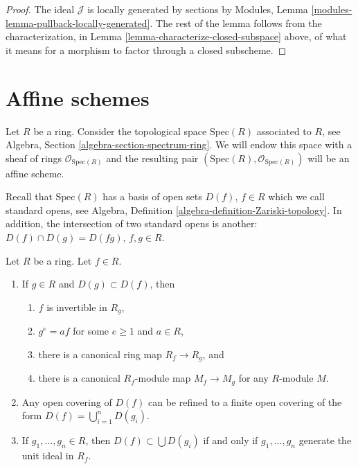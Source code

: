 \begin{proof}
The ideal $\mathcal{J}$ is locally generated by sections
by Modules, Lemma \ref{modules-lemma-pullback-locally-generated}.
The rest of the lemma follows from the characterization,
in Lemma \ref{lemma-characterize-closed-subspace} above,
of what it means for a morphism to factor through a closed
subscheme.
\end{proof}














\section{Affine schemes}
\label{section-affine-schemes}

\noindent
Let $R$ be a ring. Consider the topological space $\text{Spec}(R)$
associated to $R$, see Algebra, Section \ref{algebra-section-spectrum-ring}.
We will endow this space with a sheaf of rings $\mathcal{O}_{\text{Spec}(R)}$
and the resulting pair $(\text{Spec}(R), \mathcal{O}_{\text{Spec}(R)})$
will be an affine scheme.

\medskip\noindent
Recall that $\text{Spec}(R)$ has a basis of open sets $D(f)$,
$f \in R$ which we call standard opens, see Algebra,
Definition \ref{algebra-definition-Zariski-topology}.
In addition, the intersection of two standard opens is another:
$D(f) \cap D(g) = D(fg)$, $f, g\in R$.

\begin{lemma}
\label{lemma-standard-open}
Let $R$ be a ring. Let $f \in R$.
\begin{enumerate}
\item If $g\in R$ and $D(g) \subset D(f)$, then
\begin{enumerate}
\item $f$ is invertible in $R_g$,
\item $g^e = af$ for some $e \geq 1$ and $a \in R$,
\item there is a canonical ring map $R_f \to R_g$, and
\item there is a canonical $R_f$-module map
$M_f \to M_g$ for any $R$-module $M$.
\end{enumerate}
\item Any open covering of $D(f)$ can be refined to a finite
open covering of the form $D(f) = \bigcup_{i = 1}^n D(g_i)$.
\item If $g_1, \ldots, g_n \in R$, then $D(f) \subset \bigcup D(g_i)$
if and only if $g_1, \ldots, g_n$ generate the unit ideal in $R_f$.
\end{enumerate}
\end{lemma}

